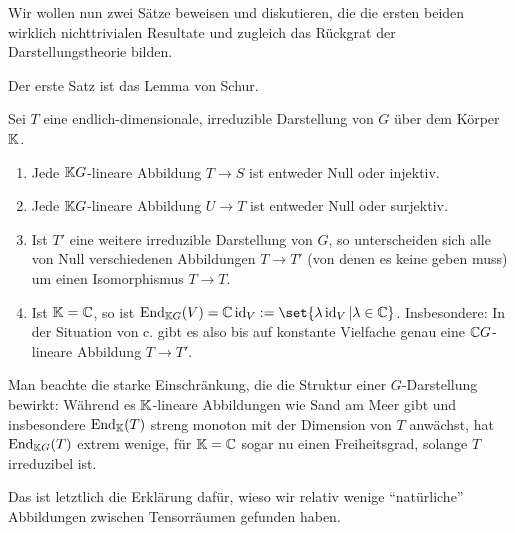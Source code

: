 \begin{remark}
Wir wollen nun zwei Sätze beweisen und diskutieren, die die ersten beiden wirklich nichttrivialen Resultate und zugleich das Rückgrat der Darstellungstheorie bilden.

Der erste Satz ist das Lemma von Schur.
\end{remark}

\begin{theorem}
Sei $T$ eine endlich-dimensionale, irreduzible Darstellung von $G$ über dem Körper $\mathbb{K}$.
\begin{enumerate}
\item Jede $\mathbb{K} G$-lineare Abbildung $T\to S$ ist entweder Null oder injektiv.
\item Jede $\mathbb{K} G$-lineare Abbildung $U\to T$ ist entweder Null oder surjektiv.
\item Ist $T'$ eine weitere irreduzible Darstellung von $G$, so unterscheiden sich alle von Null verschiedenen Abbildungen $T\to T'$ (von denen es keine geben muss) um einen Isomorphismus $T\to T$.
\item Ist $\mathbb{K}=\mathbb{C}$, so ist $\End_{\IK G}(V) = \IC\id_V := \set{\lambda\id_V | \lambda\in\IC}$. Insbesondere: In der Situation von c. gibt es also bis auf konstante Vielfache genau eine $\mathbb{C} G$-lineare Abbildung $T\to T'$.
\end{enumerate}
\end{theorem}

\begin{remark}
Man beachte die starke Einschränkung, die die Struktur einer $G$-Darstellung bewirkt: Während es $\mathbb{K}$-lineare Abbildungen wie Sand am Meer gibt und insbesondere $\operatorname{End}_{\mathbb{K}}(T)$ streng monoton mit der Dimension von $T$ anwächst, hat $\operatorname{End}_{\mathbb{K} G}(T)$ extrem wenige, für $\mathbb{K}=\mathbb{C}$ sogar nu einen Freiheitsgrad, solange $T$ irreduzibel ist.

Das ist letztlich die Erklärung dafür, wieso wir relativ wenige \enquote{natürliche} Abbildungen zwischen Tensorräumen gefunden haben.
\end{remark}

